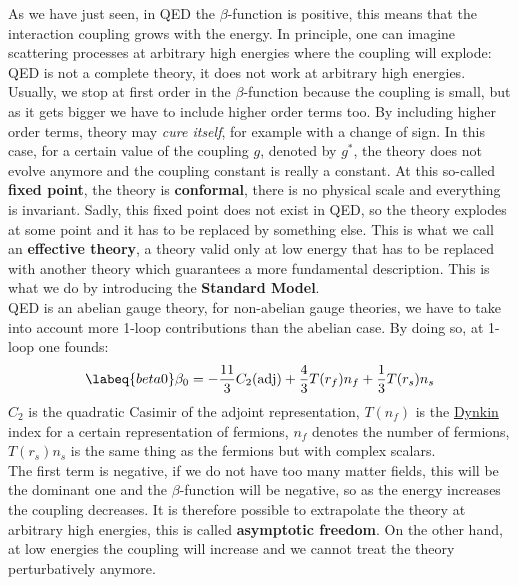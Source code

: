 \documentclass[../main.tex]{subfiles}
\begin{document}
As we have just seen, in QED the $\beta$-function is positive, this means that the interaction coupling grows with the energy. In principle, one can imagine scattering processes at arbitrary high energies where the coupling will explode: QED is not a complete theory, it does not work at arbitrary high energies.\\
Usually, we stop at first order in the $\beta$-function because the coupling is small, but as it gets bigger we have to include higher order terms too. By including higher order terms, theory may \textit{cure itself}, for example with a change of sign. In this case, for a certain value of the coupling $g$, denoted by $g^*$, the theory does not evolve anymore and the coupling constant is really a constant. At this so-called \textbf{fixed point}, the theory is \textbf{conformal}, there is no physical scale and everything is invariant. Sadly, this fixed point does not exist in QED, so the theory explodes at some point and it has to be replaced by something else. This is what we call an \textbf{effective theory}, a theory valid only at low energy that has to be replaced with another theory which guarantees a more fundamental description. This is what we do by introducing the \textbf{Standard Model}.\\
QED is an abelian gauge theory, for non-abelian gauge theories, we have to take into account more 1-loop contributions than the abelian case. By doing so, at 1-loop one founds:
\begin{equation}
\labeq{beta0}
\beta_0=-\frac{11}{3}C_2(\text{adj})+\frac{4}{3}T(r_f)n_f+\frac{1}{3}T(r_s)n_s
\end{equation}
$C_2$ is the quadratic Casimir of the adjoint representation, $T(n_f)$ is the \href{https://en.wikipedia.org/wiki/Eugene_Dynkin}{Dynkin} index for a certain representation of fermions, $n_f$ denotes the number of fermions, $T(r_s)n_s$ is the same thing as the fermions but with complex scalars.\\
The first term is negative, if we do not have too many matter fields, this will be the dominant one and the $\beta$-function will be negative, so as the energy increases the coupling decreases. It is therefore possible to extrapolate the theory at arbitrary high energies, this is called \textbf{asymptotic freedom}. On the other hand, at low energies the coupling will increase and we cannot treat the theory perturbatively anymore.\\
\end{document}
